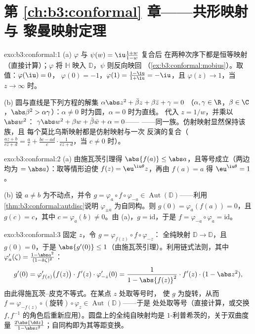 \section*{第 \ref{ch:b3:conformal} 章——共形映射与
黎曼映射定理}

\begin{solution}{exo:b3:conformal:1}
(a) $\varphi$ 与 $\psi(w) = \iu\frac{1+w}{1-w}$ 复合后
在两种次序下都是恒等映射（直接计算）；$\varphi$
将 $\mathbb H$ 映入 $\mathbb D$，$\psi$ 则反向映回
（\cref{ex:b3:conformal:mobius}）。取值：$\varphi(\iu) = 0$，
$\varphi(0) = -1$，$\varphi(1) = \frac{1 - \iu}{1 + \iu} =
-\iu$，且 $\varphi(z) \to 1$，当 $z \to \infty$ 时。

(b) 圆与直线是下列方程的解集
$\alpha\abs z^2 + \bar\beta z + \beta\bar z + \gamma = 0$
（$\alpha, \gamma \in \R$，$\beta \in \C$，$\abs\beta^2 >
\alpha\gamma$）：$\alpha \neq 0$ 时为圆，$\alpha = 0$ 时为直线。
代入 $z = 1/w$，并乘以 $\abs w^2$：
$\gamma\abs w^2 + \beta w + \bar\beta\bar w + \alpha = 0$——
——同一族。仿射映射显然保持该族，且
每个莫比乌斯映射都是仿射映射与一次
反演的复合（$\frac{az+b}{cz+d} = \frac ac + \frac{bc -
ad}{c}\cdot\frac1{cz + d}$，当 $c \neq 0$ 时）。
\end{solution}

\begin{solution}{exo:b3:conformal:2}
(a) 由施瓦茨引理得 $\abs{f(a)} \leq \abs a$，且等号成立（两边
均为 $= \abs a$）：取等情形迫使 $f(z) =
\eu^{\iu\theta}z$，再由 $f(a) = a$ 得 $\eu^{\iu\theta} = 1$。

(b) 设 $a \neq b$ 为不动点，并令 $g =
\varphi_a\circ f\circ\varphi_{-a} \in
\operatorname{Aut}(\mathbb D)$——利用
\cref{thm:b3:conformal:autdisc}说明 $\varphi_{\pm a}$ 为自同构。则
$g(0) = \varphi_a(f(a)) = 0$，且 $g(c) = c$，其中 $c =
\varphi_a(b) \neq 0$。由 (a)，$g = \mathrm{id}$，于是 $f =
\varphi_{-a}\circ\varphi_a = \mathrm{id}$。
\end{solution}

\begin{solution}{exo:b3:conformal:3}
固定 $z$，令 $g = \varphi_{f(z)}\circ f\circ\varphi_{-z}$：
全纯映射 $\mathbb D \to \mathbb D$，且 $g(0) = 0$，于是
$\abs{g'(0)} \leq 1$（由施瓦茨引理）。利用链式法则，其中
$\varphi_a'(\zeta) = \frac{1 - \abs a^2}{(1 - \bar
a\zeta)^2}$：
\[
g'(0) = \varphi_{f(z)}'\bigl(f(z)\bigr)\cdot f'(z)\cdot
\varphi_{-z}'(0)
= \frac{1}{1 - \abs{f(z)}^2}\cdot f'(z)\cdot(1 - \abs z^2),
\]
由此得施瓦茨--皮克不等式。在某点 $z$ 处取等号时，
使 $g$ 为旋转，从而 $f =
\varphi_{-f(z)}\circ(\text{旋转})\circ\varphi_z \in
\operatorname{Aut}(\mathbb D)$——于是
处处取等号（直接计算，或交换 $f, f^{-1}$
的角色后重新应用）。圆盘上的全纯自映射均是
$1$-利普希茨的，关于双曲度量 $\frac{2\abs{\dd
z}}{1 - \abs z^2}$；自同构即为其等距变换。
\end{solution}

